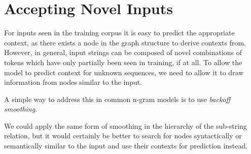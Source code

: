 \section{Accepting Novel Inputs}
For inputs seen in the training corpus it is easy to predict the appropriate context, as there exists a node in the graph structure to derive contexts from. However, in general, input strings can be composed of novel combinations of tokens which have only partially been seen in training, if at all. To allow the model to predict context for unknown sequences, we need to allow it to draw information from nodes similar to the input.

A simple way to address this in common n-gram models is to use \textit{backoff smoothing}. 

We could apply the same form of smoothing in the hierarchy of the sub-string relation, but it would certainly be better to search for nodes syntactically or semantically similar to the input and use their contexts for prediction instead.